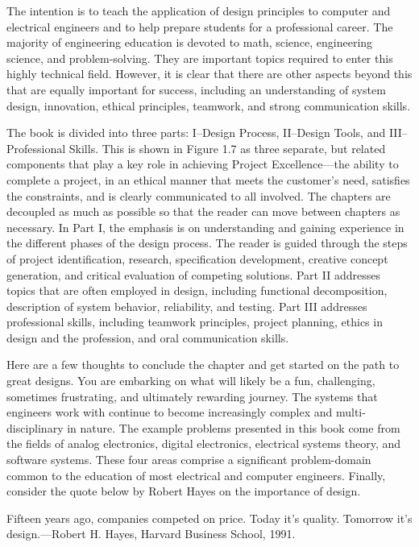 \documentclass[a4paper,10pt]{book}
\begin{document}
The intention is to teach the application of design principles to
computer and electrical engineers and to help prepare students for a
professional career. The majority of engineering education is devoted to
math, science, engineering science, and problem-solving. They are
important topics required to enter this highly technical field. However,
it is clear that there are other aspects beyond this that are equally
important for success, including an understanding of system design,
innovation, ethical principles, teamwork, and strong communication
skills.

The book is divided into three parts: I--Design Process, II--Design
Tools, and III--Professional Skills. This is shown in Figure 1.7 as
three separate, but related components that play a key role in achieving
Project Excellence---the ability to complete a project, in an ethical
manner that meets the customer's need, satisfies the constraints, and is
clearly communicated to all involved. The chapters are decoupled as much
as possible so that the reader can move between chapters as necessary.
In Part I, the emphasis is on understanding and gaining experience in
the different phases of the design process. The reader is guided through
the steps of project identification, research, specification
development, creative concept generation, and critical evaluation of
competing solutions. Part II addresses topics that are often employed in
design, including functional decomposition, description of system
behavior, reliability, and testing. Part III addresses professional
skills, including teamwork principles, project planning, ethics in
design and the profession, and oral communication skills.

Here are a few thoughts to conclude the chapter and get started on the
path to great designs. You are embarking on what will likely be a fun,
challenging, sometimes frustrating, and ultimately rewarding journey.
The systems that engineers work with continue to become increasingly
complex and multi-disciplinary in nature. The example problems presented
in this book come from the fields of analog electronics, digital
electronics, electrical systems theory, and software systems. These four
areas comprise a significant problem-domain common to the education of
most electrical and computer engineers. Finally, consider the quote
below by Robert Hayes on the importance of design.

Fifteen years ago, companies competed on price. Today it's quality.
Tomorrow it's design.---Robert H. Hayes, Harvard Business School, 1991.
\end{document}

